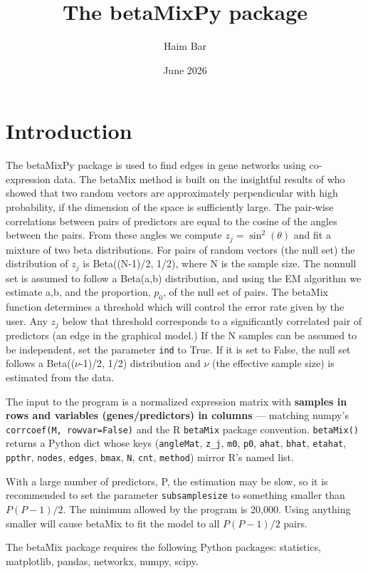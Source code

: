 \documentclass[a4paper,10pt]{article}
\title{The betaMixPy package}
\author{Haim Bar}
\date{June 2026}
\begin{document}
\maketitle

\section{Introduction}
The betaMixPy package is used to find edges in gene networks using co-expression data. The betaMix method is built on the insightful results of \cite{Frankl1990} who showed that two random vectors are approximately perpendicular with high probability, if the dimension of the space is sufficiently large. The pair-wise correlations between pairs of predictors are equal to the cosine of the angles between the pairs. From these angles we compute $z_j=\sin^2(\theta)$ and fit a mixture of two beta distributions. For pairs of random vectors (the null set) the distribution of $z_j$ is Beta((N-1)/2, 1/2), where N is the sample size. The nonnull set is assumed to follow a Beta(a,b) distribution, and using the EM algorithm we estimate a,b, and the proportion, $p_0$, of the null set of pairs. The betaMix function determines a threshold which will control the error rate given by the user. Any $z_j$ below that threshold corresponds to a significantly correlated pair of predictors (an edge in the graphical model.)
If the N samples can be assumed to be independent, set the parameter \texttt{ind} to True. If it is set to False, the null set follows a Beta(($\nu$-1)/2, 1/2) distribution and $\nu$ (the effective sample size) is estimated from the data.

The input to the program is a normalized expression matrix with \textbf{samples in rows and variables (genes/predictors) in columns} --- matching numpy's \texttt{corrcoef(M, rowvar=False)} and the R \texttt{betaMix} package convention.  \texttt{betaMix()} returns a Python dict whose keys (\texttt{angleMat}, \texttt{z\_j}, \texttt{m0}, \texttt{p0}, \texttt{ahat}, \texttt{bhat}, \texttt{etahat}, \texttt{ppthr}, \texttt{nodes}, \texttt{edges}, \texttt{bmax}, \texttt{N}, \texttt{cnt}, \texttt{method}) mirror R's named list.

With a large number of predictors, P, the estimation may be slow, so it is recommended to set the parameter \texttt{subsamplesize} to something smaller than $P(P-1)/2$. The minimum allowed by the program is 20,000. Using anything smaller will cause betaMix to fit the model to all $P(P-1)/2$ pairs. 

The betaMix package requires the following Python packages: statistics, matplotlib, pandas, networkx, numpy, scipy.
\end{document}
